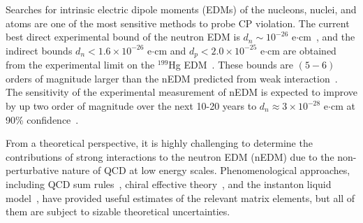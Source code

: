 \documentclass[aps,prl,twocolumn,superscriptaddress,nofootinbib]{revtex4-2}
\begin{document}
Searches for intrinsic electric dipole moments (EDMs) of the nucleons, nuclei, and atoms are one of the most sensitive methods to probe CP violation.
The current best direct experimental bound of the neutron EDM is $d_n \sim
10^{-26}$ e$\cdot$cm~\cite{Abel:2020gbr}, and the indirect bounds $d_n<1.6 \times 10^{-26}$ e$\cdot$cm and $d_p<2.0\times
10^{-25}$ e$\cdot$cm are obtained from the experimental limit  on the $^{199}$Hg EDM~\cite{Graner:2016ses}.
These bounds are $(5-6)$ orders of magnitude larger than the nEDM predicted from weak
interaction~\cite{Khriplovich:1981ca,Czarnecki:1997bu,Seng:2014lea}.
The sensitivity of the experimental measurement of nEDM is expected to improve by 
up two order of magnitude over the next 10-20 years to $d_n \approx 3 \times 10^{-28}$ e$\cdot$cm at 90\% confidence~\cite{Alarcon:2022ero,Ito2019}.

From a theoretical perspective, it is highly challenging to determine the contributions of strong interactions to the
neutron EDM (nEDM) due to the non-perturbative nature of QCD at low energy scales.
Phenomenological approaches, including QCD sum
rules~\cite{Pospelov:1999ha,Pospelov:2000bw,Lebedev:2004va,Pospelov:2005pr,Fuyuto:2012yf,Haisch:2019bml,Ema:2024vfn},
chiral effective
theory~\cite{Crewther:1979pi,Pich:1991fq,Cho:1992rv,Borasoy:2000pq,Hockings:2005cn,Narison:2008jp,Ottnad:2009jw,deVries:2010ah,Mereghetti:2010kp},
and the instanton liquid model~\cite{Faccioli:2004jz,Liu:2025kuc}, have provided useful estimates of the relevant matrix
elements, but all of them are subject to sizable theoretical uncertainties.
\end{document}
